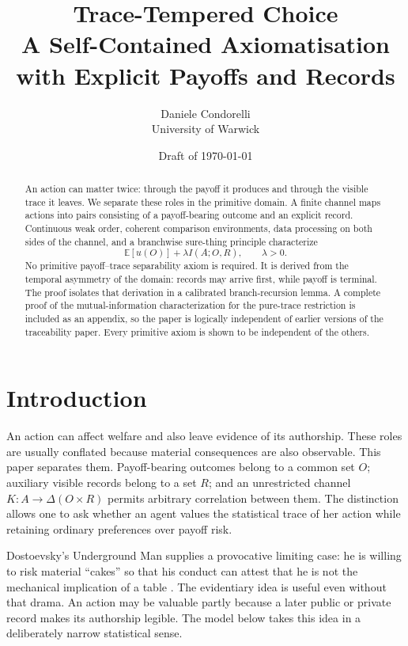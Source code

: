 \documentclass[11pt,a4paper]{article}
\title{Trace-Tempered Choice\\[0.35em]
\large A Self-Contained Axiomatisation with Explicit Payoffs and Records}
\author{Daniele Condorelli\\University of Warwick}
\date{Draft of \today}
\theoremstyle{definition}
\newcommand{\E}{\mathbb E}
\newcommand{\I}{I}
\newcommand{\1}{\mathbf 1}
\begin{document}
\maketitle

\begin{abstract}
\noindent
An action can matter twice: through the payoff it produces and through the visible trace it leaves.  We separate these
roles in the primitive domain.  A finite channel maps actions into pairs consisting of a payoff-bearing outcome and an
explicit record.  Continuous weak order, coherent comparison environments, data processing on both sides of the
channel, and a branchwise sure-thing principle characterize
\[
  \E[u(O)]+\lambda \I(A;O,R),\qquad \lambda>0.
\]
No primitive payoff--trace separability axiom is required.  It is derived from the temporal asymmetry of the domain:
records may arrive first, while payoff is terminal.  The proof isolates that derivation in a calibrated branch-recursion
lemma.  A complete proof of the mutual-information characterization for the pure-trace restriction is included as an
appendix, so the paper is logically independent of earlier versions of the traceability paper.  Every primitive axiom is
shown to be independent of the others.
\end{abstract}

\tableofcontents

\section{Introduction}

An action can affect welfare and also leave evidence of its authorship.  These roles are usually conflated because
material consequences are also observable.  This paper separates them.  Payoff-bearing outcomes belong to a common
set $O$; auxiliary visible records belong to a set $R$; and an unrestricted channel
$K:A\to\Delta(O\times R)$ permits arbitrary correlation between them.  The distinction allows one to ask whether an
agent values the statistical trace of her action while retaining ordinary preferences over payoff risk.

Dostoevsky's Underground Man supplies a provocative limiting case: he is willing to risk material ``cakes'' so that
his conduct can attest that he is not the mechanical implication of a table \cite{Dostoevsky1864}.  The evidentiary
idea is useful even without that drama.  An action may be valuable partly because a later public or private record
makes its authorship legible.  The model below takes this idea in a deliberately narrow statistical sense.
\end{document}
